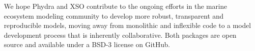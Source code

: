\documentclass[journal abbreviation, manuscript]{copernicus}
\begin{document}
We hope Phydra and XSO contribute to the ongoing efforts in the marine ecosystem modeling community to develop more robust, transparent and reproducible models, moving away from monolithic and inflexible code to a model development process that is inherently collaborative. Both packages are open source and available under a BSD-3 license on GitHub.





















\appendix
\section{}    %

\subsection{}     %


\noappendix       %


\end{document}
